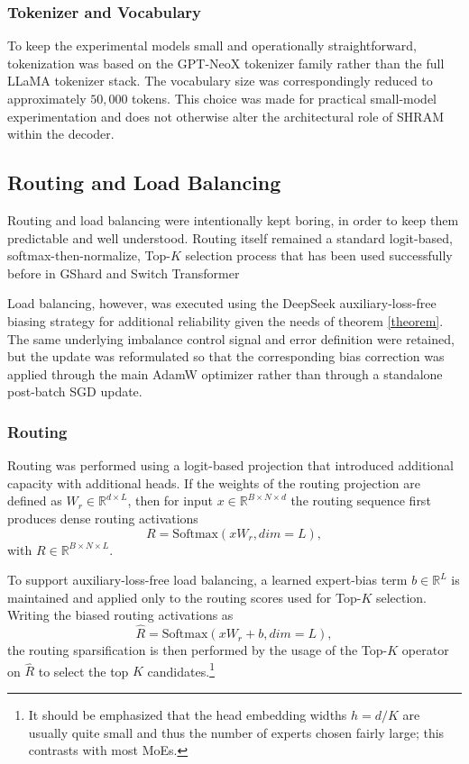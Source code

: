 \documentclass[11pt]{article}
\begin{document}
\subsubsection{Tokenizer and Vocabulary}
\label{app:tokenizer}

To keep the experimental models small and operationally straightforward, tokenization was based on the GPT-NeoX tokenizer family rather than the full LLaMA tokenizer stack. The vocabulary size was correspondingly reduced to approximately $50{,}000$ tokens. This choice was made for practical small-model experimentation and does not otherwise alter the architectural role of SHRAM within the decoder.




\subsection{Routing and Load Balancing}
\label{app:load_balancing}

Routing and load balancing were intentionally kept boring, in order to keep them predictable and well understood. Routing itself remained a standard logit-based, softmax-then-normalize, Top-$K$ selection process that has been used successfully before in GShard and Switch Transformer \cite{lepikhin2020gshard, fedus2021switch}

Load balancing, however, was executed using the DeepSeek auxiliary-loss-free biasing strategy \cite{wang2024auxiliarylossfree} for additional reliability given the needs of theorem \ref{theorem}. The same underlying imbalance control signal and error definition were retained, but the update was reformulated so that the corresponding bias correction was applied through the main AdamW optimizer rather than through a standalone post-batch SGD update.

\subsubsection{Routing}

Routing was performed using a logit-based projection that introduced additional capacity with additional heads. If the weights of the routing projection are defined as $W_r \in \mathbb{R}^{d \times L}$, then for input $x \in \mathbb{R}^{B \times N \times d}$ the routing sequence first produces dense routing activations
\[
R = \mathrm{Softmax}(xW_r, dim=L),
\]
with $R \in \mathbb{R}^{B \times N \times L}$.

To support auxiliary-loss-free load balancing, a learned expert-bias term $b \in \mathbb{R}^{L}$ is maintained and applied only to the routing scores used for Top-$K$ selection. Writing the biased routing activations as
\[
\hat{R} = \mathrm{Softmax}(xW_r + b, dim=L),
\]
the routing sparsification is then performed by the usage of the Top-$K$ operator on $\hat{R}$ to select the top $K$ candidates.\footnote{It should be emphasized that the head embedding widths $h=d/K$ are usually quite small and thus the number of experts chosen fairly large; this contrasts with most MoEs.}
\end{document}

